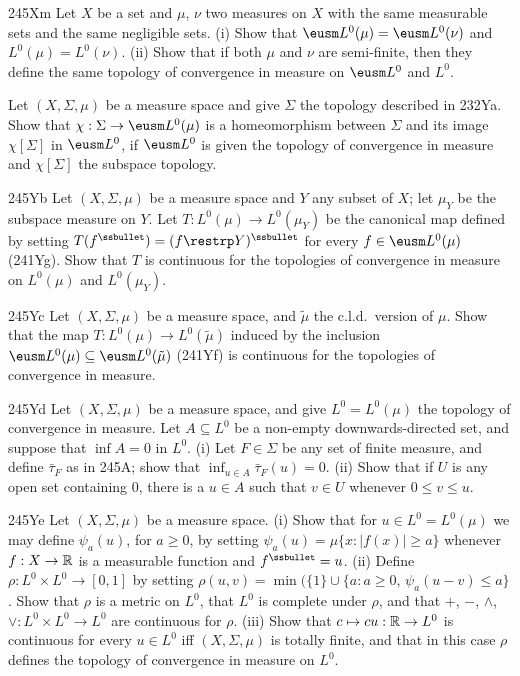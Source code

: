 {\spheader 245Xm Let $X$ be a set and $\mu$, $\nu$ two measures on $X$
with the same measurable sets and the same negligible sets.   (i) Show
that $\eusm L^0(\mu)=\eusm L^0(\nu)$ and $L^0(\mu)=L^0(\nu)$.   (ii)
Show that if both $\mu$ and $\nu$ are semi-finite,
then they define the same topology of convergence in measure on
$\eusm L^0$ and $L^0$.

Let $(X,\Sigma,\mu)$ be a measure space and give $\Sigma$ the topology
described in 232Ya.   Show that $\chi:\Sigma\to\eusm L^0(\mu)$ is a
homeomorphism between $\Sigma$ and its image $\chi[\Sigma]$ in
$\eusm L^0$, if $\eusm L^0$ is given the topology of convergence in
measure and $\chi[\Sigma]$ the subspace topology.

\spheader 245Yb
Let $(X,\Sigma,\mu)$ be a measure space and $Y$
any subset of $X$;  let $\mu_Y$ be the subspace measure on $Y$.   Let
$T:L^0(\mu)\to L^0(\mu_Y)$ be the canonical map defined by
setting $T(f^{\ssbullet})=(f\restrp Y)^{\ssbullet}$ for every
$f\in\eusm L^0(\mu)$ (241Yg).
Show that $T$ is continuous for the topologies of
convergence in measure on $L^0(\mu)$ and $L^0(\mu_Y)$.

\spheader 245Yc Let $(X,\Sigma,\mu)$ be a measure space, and
$\tilde\mu$ the c.l.d.\ version of $\mu$.   Show that the map
$T:L^0(\mu)\to L^0(\tilde\mu)$ induced by the inclusion
$\eusm L^0(\mu)\subseteq\eusm L^0(\tilde\mu)$ (241Yf) is continuous for
the topologies of convergence in measure.

\spheader 245Yd Let $(X,\Sigma,\mu)$ be a measure space, and
give $L^0=L^0(\mu)$ the topology of convergence in measure.   Let
$A\subseteq L^0$ be a non-empty downwards-directed set, and suppose that
$\inf A=0$ in $L^0$.   (i) Let
$F\in\Sigma$ be any set of finite measure, and define $\bar\tau_F$ as
in 245A;  show that $\inf_{u\in A}\bar\tau_F(u)=0$.      (ii) Show that if $U$ is any open
set containing $0$, there is a $u\in A$ such that $v\in U$ whenever
$0\le v\le u$.

\spheader 245Ye Let $(X,\Sigma,\mu)$ be a measure space.   (i) Show that
for $u\in L^0=L^0(\mu)$ we may define $\psi_a(u)$, for $a\ge 0$, by
setting $\psi_a(u)=\mu\{x:|f(x)|\ge a\}$ whenever $f:X\to\Bbb R$ is a
measurable function and $f^{\ssbullet}=u$.   (ii) Define $\rho:L^0\times
L^0\to[0,1]$ by setting
$\rho(u,v)=\min(\{1\}\cup\{a:a\ge 0,\,\psi_a(u-v)\le a\}$.   Show that
$\rho$ is a metric on $L^0$, that $L^0$ is complete under $\rho$, and that $+$, $-$, $\wedge$, $\vee:L^0\times L^0\to L^0$ are continuous for
$\rho$.   (iii) Show that $c\mapsto cu:\Bbb R\to L^0$ is continuous for
every $u\in L^0$ iff $(X,\Sigma,\mu)$ is totally finite, and that in
this case $\rho$ defines the topology of convergence in measure on
$L^0$.

}
